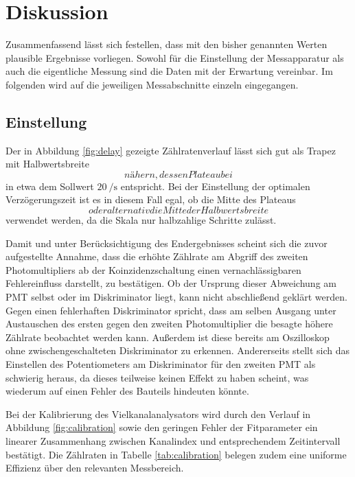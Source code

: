 \section{Diskussion}

Zusammenfassend lässt sich festellen, dass mit den bisher genannten Werten plausible Ergebnisse
vorliegen. Sowohl für die Einstellung der Messapparatur als auch die eigentliche Messung sind die
Daten mit der Erwartung vereinbar. Im folgenden wird auf die jeweiligen Messabschnitte einzeln
eingegangen.



\subsection{Einstellung}

Der in Abbildung \ref{fig:delay} gezeigte Zählratenverlauf lässt sich gut als Trapez mit Halbwertsbreite
$$ nähern, dessen Plateau bei $$ in etwa dem Sollwert
$\qty{20}{\per\second}$ entspricht. Bei der Einstellung der optimalen Verzögerungszeit ist es in diesem
Fall egal, ob die Mitte des Plateaus $$ oder alternativ die Mitte der Halbwertsbreite
$$ verwendet werden, da die Skala nur halbzahlige Schritte zulässt.

Damit und unter Berücksichtigung des Endergebnisses scheint sich die zuvor aufgestellte Annahme, dass die
erhöhte Zählrate am Abgriff des zweiten Photomultipliers ab der Koinzidenzschaltung einen vernachlässigbaren
Fehlereinfluss darstellt, zu bestätigen. Ob der Ursprung dieser Abweichung am PMT
selbst oder im Diskriminator liegt, kann nicht abschließend geklärt werden. Gegen einen fehlerhaften
Diskriminator spricht, dass am selben Ausgang unter Austauschen des ersten gegen den zweiten
Photomultiplier die besagte höhere Zählrate beobachtet werden kann. Außerdem ist diese bereits
am Oszilloskop ohne zwischengeschalteten Diskriminator zu erkennen. Andererseits stellt sich das
Einstellen des Potentiometers am Diskriminator für den zweiten PMT als schwierig
heraus, da dieses teilweise keinen Effekt zu haben scheint, was wiederum auf einen Fehler des
Bauteils hindeuten könnte.

Bei der Kalibrierung des Vielkanalanalysators wird durch den Verlauf in Abbildung \ref{fig:calibration}
sowie den geringen Fehler der Fitparameter ein linearer Zusammenhang zwischen Kanalindex und entsprechendem
Zeitintervall bestätigt. Die Zählraten in Tabelle \ref{tab:calibration} belegen zudem eine uniforme Effizienz
über den relevanten Messbereich.



